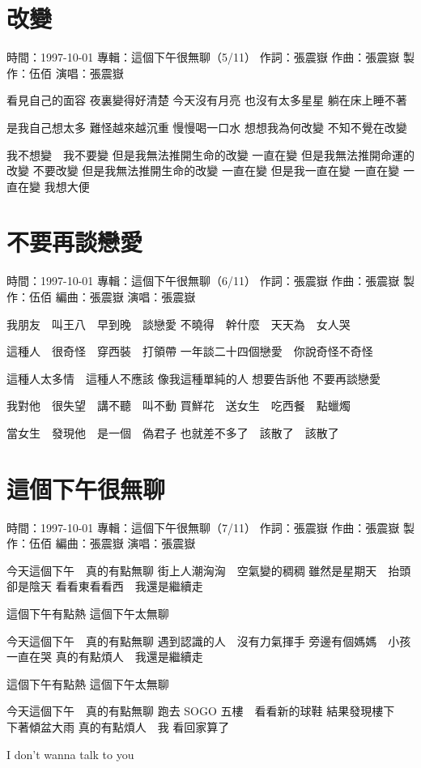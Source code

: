 \documentclass[UTF8,a4paper,oneside,twocolumn,12pt]{ctexbook}
\newcommand{\infopair}[2]{\textbullet #1：#2}
\newcommand{\zc}[1][伍佰]{\infopair{作詞}{#1}}
\newcommand{\zq}[1][伍佰]{\infopair{作曲}{#1}}
\newcommand{\bq}[1][伍佰]{\infopair{編曲}{#1}}
\newcommand{\zj}[1]{\infopair{專輯}{#1}}
\newcommand{\zz}[1]{\infopair{製作}{#1}}
\newcommand{\sj}[1]{\infopair{時間}{#1}}
\newenvironment{info}{\begin{flushleft}\kaishu
	}
	{\end{flushleft}\normalsize\yahei\par}
\newenvironment{lyric}{
	}
{}
\begin{document}
\section{改變}
\begin{info}
	\sj{1997-10-01}
	\zj{這個下午很無聊（5/11）}
	\zc[張震嶽]
	\zq[張震嶽]
	\zz{伍佰}
	\infopair{演唱}{張震嶽}
\end{info}
\begin{lyric}
	看見自己的面容 夜裏變得好清楚
	今天沒有月亮 也沒有太多星星
	躺在床上睡不著

	是我自己想太多 難怪越來越沉重
	慢慢喝一口水 想想我為何改變
	不知不覺在改變

	我不想變　我不要變
	但是我無法推開生命的改變 一直在變
	但是我無法推開命運的改變 不要改變
	但是我無法推開生命的改變 一直在變
	但是我一直在變 一直在變
	一直在變 我想大便
\end{lyric}

\section{不要再談戀愛}
\begin{info}
	\sj{1997-10-01}
	\zj{這個下午很無聊（6/11）}
	\zc[張震嶽]
	\zq[張震嶽]
	\zz{伍佰}
	\bq[張震嶽]
	\infopair{演唱}{張震嶽}
\end{info}
\begin{lyric}
	我朋友　叫王八　早到晚　談戀愛
	不曉得　幹什麼　天天為　女人哭

	這種人　很奇怪　穿西裝　打領帶
	一年談二十四個戀愛　你說奇怪不奇怪

	這種人太多情　這種人不應該
	像我這種單純的人 想要告訴他
	不要再談戀愛

	我對他　很失望　講不聽　叫不動
	買鮮花　送女生　吃西餐　點蠟燭

	當女生　發現他　是一個　偽君子
	也就差不多了　該散了　該散了
\end{lyric}

\section{這個下午很無聊}
\begin{info}
	\sj{1997-10-01}
	\zj{這個下午很無聊（7/11）}
	\zc[張震嶽]
	\zq[張震嶽]
	\zz{伍佰}
	\bq[張震嶽]
	\infopair{演唱}{張震嶽}
\end{info}
\begin{lyric}
	今天這個下午　真的有點無聊
	街上人潮洶洶　空氣變的稠稠
	雖然是星期天　抬頭卻是陰天
	看看東看看西　我還是繼續走

	這個下午有點熱 這個下午太無聊

	今天這個下午　真的有點無聊
	遇到認識的人　沒有力氣揮手
	旁邊有個媽媽　小孩一直在哭
	真的有點煩人　我還是繼續走

	這個下午有點熱 這個下午太無聊

	今天這個下午　真的有點無聊
	跑去 SOGO 五樓　看看新的球鞋
	結果發現樓下　下著傾盆大雨
	真的有點煩人　我 看回家算了

	I don't wanna talk to you
\end{lyric}
\end{document}

